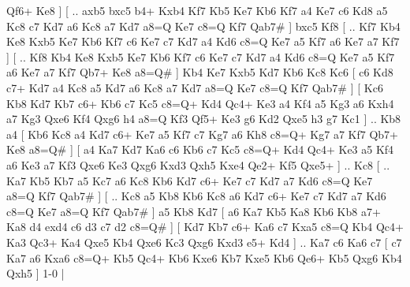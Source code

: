 Qf6+ Ke8   ]  [ .. axb5  bxc5 b4+  Kxb4 Kf7  Kb5 Ke7  Kb6 Kf7  a4 Ke7  c6 Kd8  a5 Kc8  c7 Kd7  a6 Kc8  a7 Kd7  a8=Q Ke7  c8=Q Kf7  Qab7#   ]  bxc5   Kf8    [ .. Kf7  Kb4 Ke8  Kxb5 Ke7  Kb6 Kf7  c6 Ke7  c7 Kd7  a4 Kd6  c8=Q Ke7  a5 Kf7  a6 Ke7  a7 Kf7   ]  [ .. Kf8  Kb4 Ke8  Kxb5 Ke7  Kb6 Kf7  c6 Ke7  c7 Kd7  a4 Kd6  c8=Q Ke7  a5 Kf7  a6 Ke7  a7 Kf7  Qb7+ Ke8  a8=Q#   ]  Kb4   Ke7    Kxb5   Kd7    Kb6   Kc8    Kc6 [  c6 Kd8  c7+ Kd7  a4 Kc8  a5 Kd7  a6 Kc8  a7 Kd7  a8=Q Ke7  c8=Q Kf7  Qab7#   ]  [  Kc6 Kb8  Kd7 Kb7  c6+ Kb6  c7 Kc5  c8=Q+ Kd4  Qc4+ Ke3  a4 Kf4  a5 Kg3  a6 Kxh4  a7 Kg3  Qxe6 Kf4  Qxg6 h4  a8=Q Kf3  Qf5+ Ke3  g6 Kd2  Qxe5 h3  g7 Kc1   ] .. Kb8    a4 [  Kb6 Kc8  a4 Kd7  c6+ Ke7  a5 Kf7  c7 Kg7  a6 Kh8  c8=Q+ Kg7  a7 Kf7  Qb7+ Ke8  a8=Q#   ]  [  a4 Ka7  Kd7 Ka6  c6 Kb6  c7 Kc5  c8=Q+ Kd4  Qc4+ Ke3  a5 Kf4  a6 Ke3  a7 Kf3  Qxe6 Ke3  Qxg6 Kxd3  Qxh5 Kxe4  Qe2+ Kf5  Qxe5+   ] .. Kc8    [ .. Ka7  Kb5 Kb7  a5 Kc7  a6 Kc8  Kb6 Kd7  c6+ Ke7  c7 Kd7  a7 Kd6  c8=Q Ke7  a8=Q Kf7  Qab7#   ]  [ .. Kc8  a5 Kb8  Kb6 Kc8  a6 Kd7  c6+ Ke7  c7 Kd7  a7 Kd6  c8=Q Ke7  a8=Q Kf7  Qab7#   ]  a5   Kb8    Kd7 [  a6 Ka7  Kb5 Ka8  Kb6 Kb8  a7+ Ka8  d4 exd4  c6 d3  c7 d2  c8=Q#   ]  [  Kd7 Kb7  c6+ Ka6  c7 Kxa5  c8=Q Kb4  Qc4+ Ka3  Qc3+ Ka4  Qxe5 Kb4  Qxe6 Kc3  Qxg6 Kxd3  e5+ Kd4   ] .. Ka7    c6   Ka6    c7    [  c7 Ka7  a6 Kxa6  c8=Q+ Kb5  Qc4+ Kb6  Kxe6 Kb7  Kxe5 Kb6  Qe6+ Kb5  Qxg6 Kb4  Qxh5   ] 1-0  |
